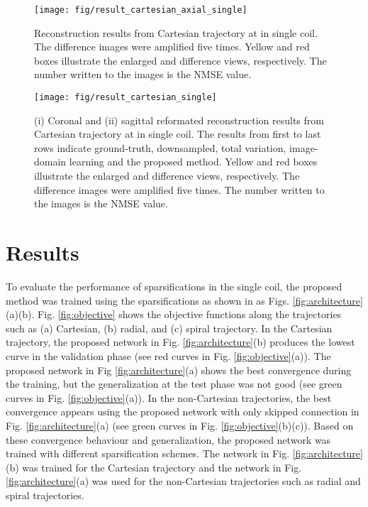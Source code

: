 \documentclass[10pt,journal]{IEEEtran}
\newcommand{\0}{{\boldsymbol{0}}}
\begin{document}
\begin{figure}[!ht] 	
\centerline{\texttt{[image: fig/result\_cartesian\_axial\_single]}}
\caption{Reconstruction results from Cartesian trajectory at  in single coil.
The difference images were amplified five times. Yellow and red boxes illustrate the enlarged and difference views, respectively. The number written to the images is the NMSE value.}
\label{fig:result_cartesian_axial_single}
\end{figure}

 \begin{figure}[!hbt] 	
\centerline
{\texttt{[image: fig/result\_cartesian\_single]}}
\caption{(i) Coronal and (ii) sagittal reformated reconstruction results from Cartesian trajectory at  in single coil. The results from first to last rows indicate ground-truth, downsampled, total variation, image-domain learning and the proposed method. Yellow and red boxes illustrate the enlarged and difference views, respectively. The difference images were amplified five times. The number written to the images is the NMSE value. }
\label{fig:result_cartesian_single}
\end{figure}



 \section{Results}\label{sec:result}
 

To evaluate the performance of sparsifications  in the single coil, the proposed method was trained using the sparsifications as shown in as Figs. \ref{fig:architecture}(a)(b). Fig. \ref{fig:objective} shows the objective functions along the trajectories such as (a) Cartesian, (b) radial, and (c) spiral trajectory. In the Cartesian trajectory, the proposed network in Fig. \ref{fig:architecture}(b) produces the lowest curve in the validation phase (see red curves in Fig. \ref{fig:objective}(a)). The proposed network in Fig \ref{fig:architecture}(a) shows the best convergence during
the training, but the generalization at the test phase was not good (see green curves in Fig. \ref{fig:objective}(a)). In the non-Cartesian trajectories, the best convergence appears using the proposed network with only skipped connection in Fig. \ref{fig:architecture}(a) (see green curves in Fig. \ref{fig:objective}(b)(c)). 
Based on these convergence behaviour and generalization, the proposed network was trained with different sparsification schemes. The network in Fig. \ref{fig:architecture}(b) was trained for the Cartesian trajectory and the network in Fig. \ref{fig:architecture}(a) was used for the non-Cartesian trajectories such as radial and spiral trajectories.
\end{document}
